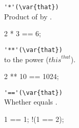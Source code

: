 \begin{urbiscriptapi}
\item \lstinline|'*'(\var{that})|\\
  Product of \this by .
\begin{urbiassert}
2 * 3 == 6;
\end{urbiassert}

\item \lstinline|'**'(\var{that})|\\
  \this to the  power (${this}^{that}$).
\begin{urbiassert}
2 ** 10 == 1024;
\end{urbiassert}

\item \lstinline|'=='(\var{that})|\\
  Whether \this equals .
\begin{urbiassert}
  1 == 1;
!(1 == 2);
\end{urbiassert}
\end{urbiscriptapi}

